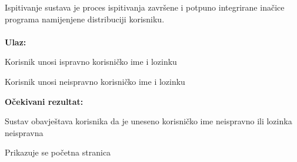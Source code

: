 			
			Ispitivanje sustava je proces ispitivanja završene i potpuno integrirane inačice programa namijenjene distribuciji korisniku.\\
			
			\noindent {}\\
			\textbf{Ulaz: }	
				\begin{packed_enum}
					\item Korisnik unosi ispravno korisničko ime i lozinku
					\item Korisnik unosi neispravno korisničko ime i lozinku
					
				\end{packed_enum}
				
			\noindent \textbf{Očekivani rezultat:}
				
				\begin{packed_enum}
					\item Sustav obavještava korisnika da je uneseno korisničko ime neispravno ili lozinka neispravna
					\item Prikazuje se početna stranica
					
				\end{packed_enum}
				
